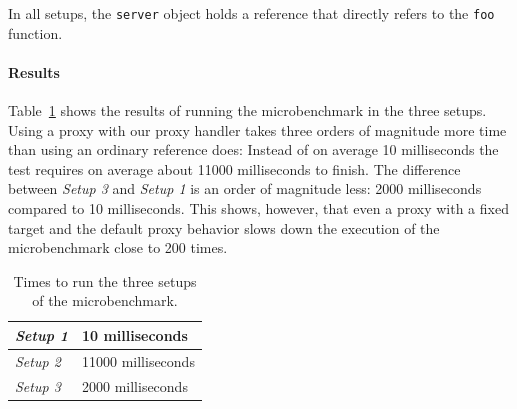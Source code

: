 In all setups, the \lstinline{server} object holds a reference that directly refers to the \lstinline{foo} function.


\paragraph{Results}
Table~\ref{table:microbenchmarkResults} shows the results of running the microbenchmark in the three setups.
Using a proxy with our proxy handler takes three orders of magnitude more time than using an ordinary reference does: Instead of on average 10 milliseconds the test requires on average about 11000 milliseconds to finish.
The difference between \emph{Setup 3} and \emph{Setup 1} is an order of magnitude less: 2000 milliseconds compared to 10 milliseconds.
This shows, however, that even a proxy with a fixed target and the default proxy behavior slows down the execution of the microbenchmark close to 200 times.

\begin{table}[h]
\begin{center}
\begin{tabular}{| l | l |}
\hline
\emph{Setup 1} & 10 milliseconds \\ \hline
\emph{Setup 2} & 11000 milliseconds \\ \hline
\emph{Setup 3} & 2000 milliseconds \\ \hline
\end{tabular}
\end{center}
\caption[Table caption text]{Times to run the three setups of the microbenchmark.}
\label{table:microbenchmarkResults}
\end{table}

